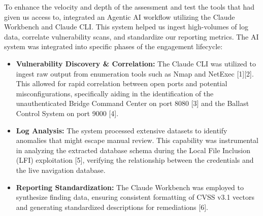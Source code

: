 To enhance the velocity and depth of the assessment and test the tools that \client had given us access to, \team integrated an Agentic AI workflow utilizing the Claude Workbench and Claude CLI. This system helped us ingest high-volumes of log data, correlate vulnerability scans, and standardize our reporting metrics.\bigskip
\bigskip
The AI system was integrated into specific phases of the engagement lifecycle:

\begin{itemize}
\item \textbf{Vulnerability Discovery \& Correlation:} The Claude CLI was utilized to ingest raw output from enumeration tools such as Nmap and NetExec [1][2]. This allowed for rapid correlation between open ports and potential misconfigurations, specifically aiding in the identification of the unauthenticated Bridge Command Center on port 8080 [3] and the Ballast Control System on port 9000 [4].\item \textbf{Log Analysis:} The system processed extensive datasets to identify anomalies that might escape manual review. This capability was instrumental in analyzing the extracted database schema during the Local File Inclusion (LFI) exploitation [5], verifying the relationship between the \texttt{} credentials and the live navigation database.\item \textbf{Reporting Standardization:} The Claude Workbench was employed to synthesize finding data, ensuring consistent formatting of CVSS v3.1 vectors and generating standardized descriptions for remediations [6].
\end{itemize}

